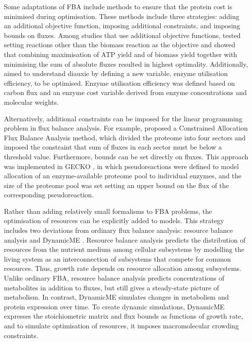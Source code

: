 Some adaptations of FBA include methods to ensure that the protein cost is minimised during optimisation.
These methods include three strategies: adding an additional objective function, imposing additional constraints, and imposing bounds on fluxes.
Among studies that use additional objective functions, \textcite{schuetzMultidimensionalOptimalityMicrobial2012} tested setting reactions other than the biomass reaction as the objective and showed that combining maximisation of ATP yield and of biomass yield together with minimising the sum of absolute fluxes resulted in highest optimality.
Additionally, \textcite{wangGrowthStrategyMicrobes2019} aimed to understand diauxie by defining a new variable, enzyme utilisation efficiency, to be optimised.
Enzyme utilisation efficiency was defined based on carbon flux and an enzyme cost variable derived from enzyme concentrations and molecular weights.

Alternatively, additional constraints can be imposed for the linear programming problem in flux balance analysis.
For example, \textcite{moriConstrainedAllocationFlux2016} proposed a Constrained Allocation Flux Balance Analysis method, which divided the proteome into four sectors and imposed the constraint that sum of fluxes in each sector must be below a threshold value.
Furthermore, bounds can be set directly on fluxes.
This approach was implemented in GECKO \parencite{sanchezImprovingPhenotypePredictions2017,domenzainReconstructionCatalogueGenomescale2022}, in which pseudoreactions were defined to model allocation of an enzyme-available proteome pool to individual enzymes, and the size of the proteome pool was set setting an upper bound on the flux of the corresponding pseudoreaction.

Rather than adding relatively small formalisms to FBA problems, the optimisation of resources can be explicitly added to models.
This strategy includes two deviations from ordinary flux balance analysis: resource balance analysis \parencite{goelzerCellDesignBacteria2011} and DynamicME \parencite{yangDynamicMEDynamicSimulation2019}.
Resource balance analysis predicts the distribution of resources from the nutrient medium among cellular subsystems by modelling the living system as an interconnection of subsystems that compete for common resources.
Thus, growth rate depends on resource allocation among subsystems.
Unlike ordinary FBA, resource balance analysis predicts concentrations of metabolites in addition to fluxes, but still gives a steady-state picture of metabolism.
In contrast, DynamicME simulates changes in metabolism and protein expression over time.
To create dynamic simulations, DynamicME expresses the stoichiometric matrix and flux bounds as functions of growth rate, and to simulate optimisation of resources, it imposes macromolecular crowding constraints.

